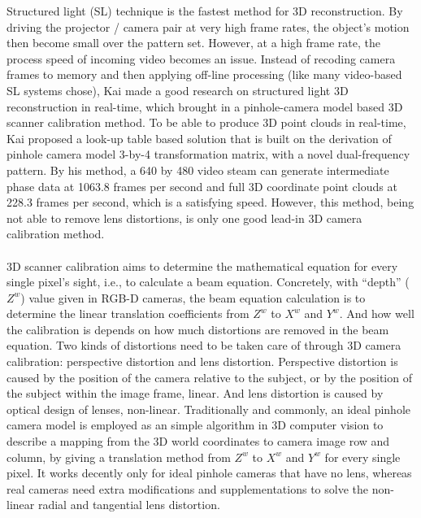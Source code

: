 Structured light (SL) technique is the fastest method for 3D reconstruction. By driving the projector / camera pair at very high frame rates, the object's motion then become small over the pattern set. However, at a high frame rate, the process speed of incoming video becomes an issue. Instead of recoding camera frames to memory and then applying off-line processing (like many video-based SL systems chose), Kai \cite{Kai10} made a good research on structured light 3D reconstruction in real-time, which brought in a pinhole-camera model based 3D scanner calibration method. %
To be able to produce 3D point clouds in real-time, Kai proposed a look-up table based solution that is built on the derivation of pinhole camera model 3-by-4 transformation matrix, with a novel dual-frequency pattern. By his method, a 640 by 480 video steam can generate intermediate phase data at 1063.8 frames per second and full 3D coordinate point clouds at 228.3 frames per second, which is a satisfying speed. However, this method, being not able to remove lens distortions, is only one good lead-in 3D camera calibration method.%
\\\\%
3D scanner calibration aims to determine the mathematical equation for every single pixel's sight, i.e., to calculate a beam equation. Concretely, with \enquote{depth} (\(Z^{w}\)) value given in RGB-D cameras, the beam equation calculation is to determine the linear translation coefficients from \(Z^{w}\) to \(X^{w}\) and \(Y^{w}\). And how well the calibration is depends on how much distortions are removed in the beam equation.%
Two kinds of distortions need to be taken care of through 3D camera calibration: perspective distortion and lens distortion. Perspective distortion is caused by the position of the camera relative to the subject, or by the position of the subject within the image frame, linear. And lens distortion is caused by optical design of lenses, non-linear. Traditionally and commonly, an ideal pinhole camera model is employed as an simple algorithm in 3D computer vision to describe a mapping from the 3D world coordinates to camera image row and column, by giving a translation method from \(Z^{w}\) to \(X^{w}\)  and \(Y^{w}\)  for every single pixel. It works decently only for ideal pinhole cameras that have no lens, whereas real cameras need extra modifications and supplementations to solve the non-linear radial and tangential lens distortion.%
